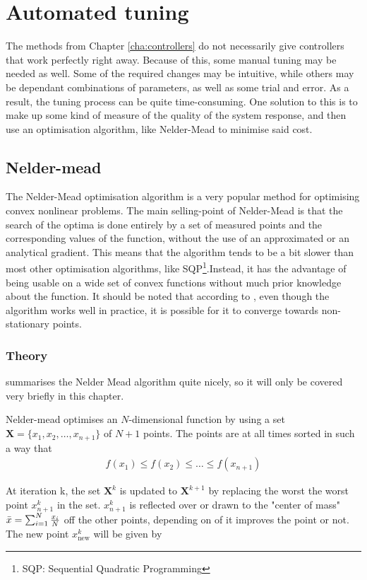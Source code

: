 \chapter{Automated tuning}
\label{cha:automated_tuning}
The methods from Chapter \ref{cha:controllers} do not necessarily give controllers that work perfectly right away. Because of this, some manual tuning may be needed as well. Some of the required changes may be intuitive, while others may be dependant combinations of parameters, as well as some trial and error. As a result, the tuning process can be quite time-consuming. One solution to this is to make up some kind of measure of the quality of the system response, and then use an optimisation algorithm, like Nelder-Mead to minimise said cost.


\section{Nelder-mead}
The Nelder-Mead optimisation algorithm is a very popular method for optimising convex nonlinear problems. The main selling-point of Nelder-Mead is that the search of the optima is done entirely by a set of measured points and the corresponding values of the function, without the use of an approximated or an analytical gradient. This means that the algorithm tends to be a bit slower than most other optimisation algorithms, like SQP\footnote{SQP: Sequential Quadratic Programming}.Instead, it has the advantage of being usable on a wide set of convex functions without much prior knowledge about the function. It should be noted that according to \cite{Nelder_Mead_convergence_issues}, even though the algorithm works well in practice, it is possible for it to converge towards non-stationary points. 

\subsection{Theory}
\cite{Nelder_Mead_source} summarises the Nelder Mead algorithm quite nicely, so it will only be covered very briefly in this chapter. 

\noindent
Nelder-mead optimises an $N$-dimensional function by using a set $\mathbf{X} = \{x_1, x_{2}, \dots , x_{n+1}\}$ of $N+1$ points. The points are at all times sorted in such a way that
\begin{align}
    f(x_1) \leq f(x_2) \leq \dots \leq f(x_{n+1})
\end{align}

\noindent
At iteration k, the set $\mathbf{X}^k$ is updated to $\mathbf{X}^{k+1}$ by replacing the worst the worst point $x_{n+1}^k$ in the set. $x_{n+1}^k$ is reflected over or drawn to the "center of mass" $\Bar{x} = \sum_{i=1}^N\frac{x_i}{N}$ off the other points, depending on of it improves the point or not. The new point $x_{\text{new}}^k$ will be given by 

